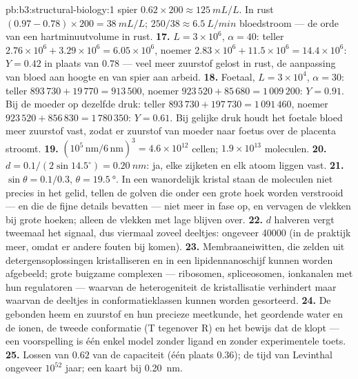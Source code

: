\begin{solution}{pb:b3:structural-biology:1}
spier $0.62\times 200 \approx \qty{125}{mL/L}$. In rust $(0.97 - 0.78)\times
200 = \qty{38}{mL/L}$; $250/38 \approx \qty{6.5}{L/min}$
bloedstroom --- de orde van een hartminuutvolume in rust.
\textbf{17.} $L = 3\times 10^{6}$, $\alpha = 40$: teller $2.76\times
10^{6} + 3.29\times 10^{6} = 6.05\times 10^{6}$, noemer $2.83\times
10^{6} + 11.5\times 10^{6} = 14.4\times 10^{6}$: $Y = 0.42$ in plaats
van $0.78$ --- veel meer zuurstof gelost in rust, de aanpassing van
bloed aan hoogte en van spier aan arbeid.
\textbf{18.} Foetaal, $L = 3\times 10^{4}$, $\alpha = 30$: teller
$893\,730 + 19\,770 = 913\,500$, noemer $923\,520 + 85\,680 =
1\,009\,200$: $Y = 0.91$. Bij de moeder op dezelfde druk: teller
$893\,730 + 197\,730 = 1\,091\,460$, noemer $923\,520 + 856\,830
= 1\,780\,350$: $Y = 0.61$. Bij gelijke druk houdt het foetale bloed
meer zuurstof vast, zodat er zuurstof van moeder naar foetus over de
placenta stroomt.
\textbf{19.} $(10^{5}\,\text{nm}/6\,\text{nm})^{3} = 4.6\times 10^{12}$
cellen; $1.9\times 10^{13}$ moleculen.
\textbf{20.} $d = 0.1/(2\sin 14.5^{\circ}) = \qty{0.20}{nm}$: ja, elke
zijketen en elk atoom liggen vast.
\textbf{21.} $\sin\theta = 0.1/0.3$, $\theta = \qty{19.5}{\degree}$. In
een wanordelijk kristal staan de moleculen niet precies in het gelid,
tellen de golven die onder een grote hoek worden verstrooid --- en die
de fijne details bevatten --- niet meer in fase op, en vervagen de
vlekken bij grote hoeken; alleen de vlekken met lage  blijven
over.
\textbf{22.} $d$ halveren vergt tweemaal het signaal, dus viermaal
zoveel deeltjes: ongeveer \num{40000} (in de praktijk meer, omdat er
andere fouten bij komen).
\textbf{23.} Membraaneiwitten, die zelden uit detergensoplossingen
kristalliseren en in een lipidennanoschijf kunnen worden afgebeeld;
grote buigzame complexen --- ribosomen, spliceosomen, ionkanalen met
hun regulatoren --- waarvan de heterogeniteit de kristallisatie
verhindert maar waarvan de deeltjes in conformatieklassen kunnen worden
gesorteerd.
\textbf{24.} De gebonden heem en zuurstof en hun precieze meetkunde,
het geordende water en de ionen, de tweede conformatie (T tegenover R)
en het bewijs dat de  klopt --- een voorspelling is één enkel
model zonder ligand en zonder experimentele toets.
\textbf{25.} Lossen van $0.62$ van de capaciteit (één plaats $0.36$); de
tijd van Levinthal ongeveer $10^{52}$ jaar; een kaart bij
\qty{0.20}{nm}.
\end{solution}
